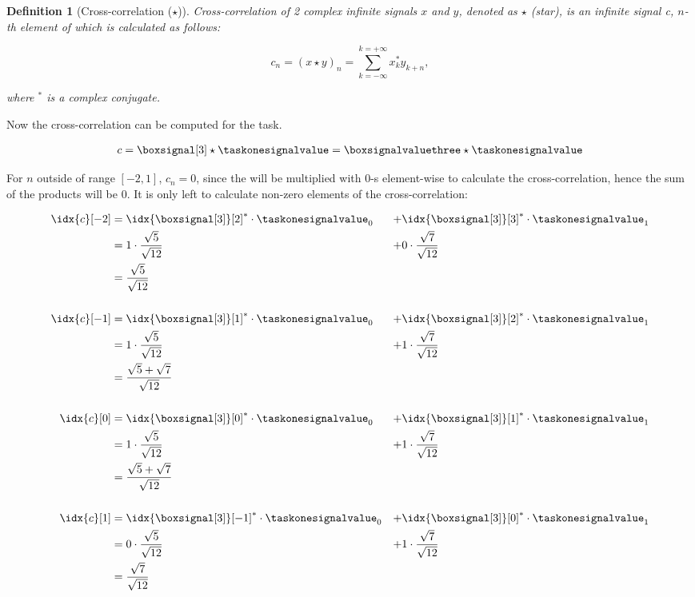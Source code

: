 \documentclass[a4paper]{article}
\theoremstyle{break}
\newtheorem{definition}{Definition}[section]
\theoremstyle{break}
\begin{document}
\begin{definition}[Cross-correlation ($\star$)]
  Cross-correlation of 2 complex infinite signals $x$ and $y$, denoted as $\star$ (star), is an infinite signal c, $n$-th element of which is calculated as follows:

  \begin{equation*}
    c_n = (x \star y)_n = \sum_{k = -\infty}^{k = +\infty} x_k^* y_{k + n},
  \end{equation*}

  where $^*$ is a complex conjugate.
\end{definition}

Now the cross-correlation can be computed for the task.

\begin{equation*}
  \begin{split}
    c = \boxsignal[3] \star \taskonesignalvalue = \boxsignalvaluethree \star \taskonesignalvalue
  \end{split}
\end{equation*}

For $n$ outside of range $[-2, 1]$, $c_n = 0$, since the \taskonesignalvalue will be multiplied with 0-s element-wise to calculate the cross-correlation, hence the sum of the products will be 0. It is only left to calculate non-zero elements of the cross-correlation:

\begin{alignat*}{2}
  \idx{c}[-2]
    &= \idx{\boxsignal[3]}[2]^* \cdot \taskonesignalvalue_0 &+ &\idx{\boxsignal[3]}[3]^* \cdot \taskonesignalvalue_1 \\
    &= 1 \cdot \frac{\sqrt{5}}{\sqrt{12}} &+ &0 \cdot \frac{\sqrt{7}}{\sqrt{12}} \\
    &= \frac{\sqrt{5}}{\sqrt{12}} && \\
  \\
  \idx{c}[-1]
    &= \idx{\boxsignal[3]}[1]^* \cdot \taskonesignalvalue_0 &+ &\idx{\boxsignal[3]}[2]^* \cdot \taskonesignalvalue_1 \\
    &= 1 \cdot \frac{\sqrt{5}}{\sqrt{12}} &+ &1 \cdot \frac{\sqrt{7}}{\sqrt{12}} \\
    &= \frac{\sqrt{5} + \sqrt{7}}{\sqrt{12}} && \\
    \\
    \idx{c}[0]
      &= \idx{\boxsignal[3]}[0]^* \cdot \taskonesignalvalue_0 &+ &\idx{\boxsignal[3]}[1]^* \cdot \taskonesignalvalue_1 \\
      &= 1 \cdot \frac{\sqrt{5}}{\sqrt{12}} &+ &1 \cdot \frac{\sqrt{7}}{\sqrt{12}} \\
      &= \frac{\sqrt{5} + \sqrt{7}}{\sqrt{12}} && \\
    \\
    \idx{c}[1]
      &= \idx{\boxsignal[3]}[-1]^* \cdot \taskonesignalvalue_0 &+ &\idx{\boxsignal[3]}[0]^* \cdot \taskonesignalvalue_1 \\
      &= 0 \cdot \frac{\sqrt{5}}{\sqrt{12}} &+ &1 \cdot \frac{\sqrt{7}}{\sqrt{12}} \\
      &= \frac{\sqrt{7}}{\sqrt{12}} && \\
\end{alignat*}
\end{document}

